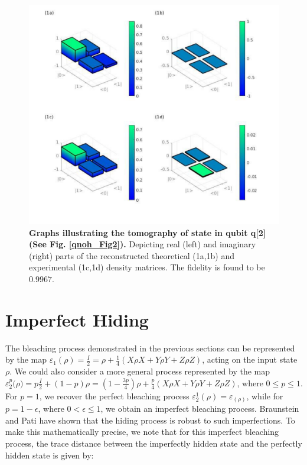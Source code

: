 \begin{figure}[]
\includegraphics[scale=0.5]{qnoh_Fig4}
\caption{\textbf{Graphs illustrating the tomography of state in qubit q[2] (See Fig. \ref{qnoh_Fig2}).} Depicting real (left) and imaginary (right) parts of the reconstructed theoretical (1a,1b) and experimental (1c,1d) density matrices. The fidelity is found to be $0.9967$.}
\label{qnoh_Fig4}
\end{figure}

\section{Imperfect Hiding}

The bleaching process demonstrated in the previous sections can be represented by the map $\varepsilon_1(\rho)=\frac{I}{2}=\rho+ \frac{1}{4}(X \rho X + Y \rho Y + Z \rho Z)$, acting on the input state $\rho$. We could also consider a more general process represented by the map $\varepsilon^p_2\big(\rho\big)=p\frac{I}{2}+(1-p)\rho=(1-\frac{3p}{4})\rho+\frac{p}{4}(X \rho X + Y \rho Y + Z \rho Z)$, where $0\leq p \leq 1$. For $p=1$, we recover the perfect bleaching process $\varepsilon^1_2(\rho)=\varepsilon_(\rho)$, while for $p=1-\epsilon$, where $0 < \epsilon \leq 1$, we obtain an imperfect bleaching process. Braunstein and Pati \cite{qnoh_no-hiding} have shown that the hiding process is robust to such imperfections. To make this mathematically precise, we note that for this imperfect bleaching process, the trace distance between the imperfectly hidden state and the perfectly hidden state is given by:

